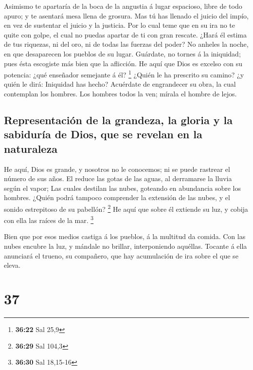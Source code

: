  Asimismo te apartaría de la boca de la angustia á lugar
espacioso, libre de todo apuro; y te asentará mesa llena de grosura.
 Mas tú has llenado el juicio del impío, en vez de
sustentar el juicio y la justicia.  Por lo cual teme que en
su ira no te quite con golpe, el cual no puedas apartar de ti con gran
rescate.  ¿Hará él estima de tus riquezas, ni del oro, ni
de todas las fuerzas del poder?  No anheles la noche, en
que desaparecen los pueblos de su lugar.  Guárdate, no
tornes á la iniquidad; pues ésta escogiste más bien que la aflicción.
 He aquí que Dios es excelso con su potencia: ¿qué
enseñador semejante á él? \footnote{\textbf{36:22} Sal 25,9}
 ¿Quién le ha prescrito su camino? ¿y quién le dirá:
Iniquidad has hecho?  Acuérdate de engrandecer su obra, la
cual contemplan los hombres.  Los hombres todos la ven;
mírala el hombre de lejos.

\hypertarget{representaciuxf3n-de-la-grandeza-la-gloria-y-la-sabiduruxeda-de-dios-que-se-revelan-en-la-naturaleza}{%
\subsection{Representación de la grandeza, la gloria y la sabiduría de
Dios, que se revelan en la
naturaleza}\label{representaciuxf3n-de-la-grandeza-la-gloria-y-la-sabiduruxeda-de-dios-que-se-revelan-en-la-naturaleza}}

 He aquí, Dios es grande, y nosotros no le conocemos; ni se
puede rastrear el número de sus años.  El reduce las gotas
de las aguas, al derramarse la lluvia según el vapor;  Las
cuales destilan las nubes, goteando en abundancia sobre los hombres.
 ¿Quién podrá tampoco comprender la extensión de las nubes,
y el sonido estrepitoso de su pabellón? \footnote{\textbf{36:29} Sal
  104,3}  He aquí que sobre él extiende su luz, y cobija
con ella las raíces de la mar. \footnote{\textbf{36:30} Sal 18,15-16}

 Bien que por esos medios castiga á los pueblos, á la
multitud da comida.  Con las nubes encubre la luz, y
mándale no brillar, interponiendo aquéllas.  Tocante á ella
anunciará el trueno, su compañero, que hay acumulación de ira sobre el
que se eleva.

\hypertarget{section-36}{%
\section{37}\label{section-36}}

